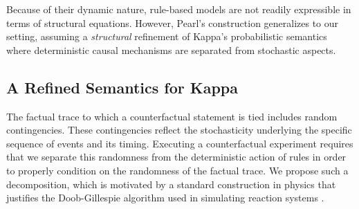 Because of their dynamic nature, rule-based models are not readily
expressible in terms of structural equations. However, Pearl's
construction generalizes to our setting, assuming a \emph{structural}
refinement of Kappa's probabilistic semantics where deterministic
causal mechanisms are separated from stochastic aspects.

\subsection{A Refined Semantics for Kappa}
\label{subsec:semantics-refinement}

The factual trace to which a counterfactual statement is tied includes
random contingencies. These contingencies reflect the stochasticity
underlying the specific sequence of events and its timing.
Executing a counterfactual
experiment requires that we separate this randomness from the
deterministic action of rules in order to properly condition on 
the randomness of the factual trace.
We propose such a decomposition,
which is motivated by a standard construction in physics that
justifies the Doob-Gillespie algorithm used in simulating reaction
systems \cite{gillespie1977exact}.


